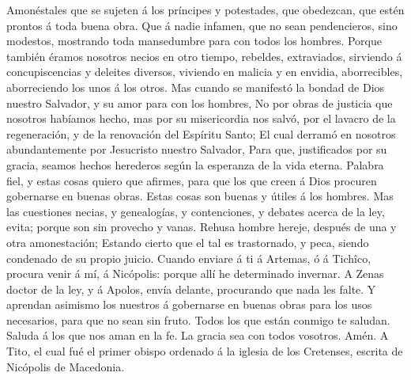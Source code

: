  Amonéstales que se sujeten á los príncipes y potestades,
que obedezcan, que estén prontos á toda buena obra.  Que á
nadie infamen, que no sean pendencieros, sino modestos, mostrando toda
mansedumbre para con todos los hombres.  Porque también
éramos nosotros necios en otro tiempo, rebeldes, extraviados, sirviendo
á concupiscencias y deleites diversos, viviendo en malicia y en envidia,
aborrecibles, aborreciendo los unos á los otros.  Mas cuando
se manifestó la bondad de Dios nuestro Salvador, y su amor para con los
hombres,  No por obras de justicia que nosotros habíamos
hecho, mas por su misericordia nos salvó, por el lavacro de la
regeneración, y de la renovación del Espíritu Santo;  El
cual derramó en nosotros abundantemente por Jesucristo nuestro Salvador,
 Para que, justificados por su gracia, seamos hechos
herederos según la esperanza de la vida eterna.  Palabra
fiel, y estas cosas quiero que afirmes, para que los que creen á Dios
procuren gobernarse en buenas obras. Estas cosas son buenas y útiles á
los hombres.  Mas las cuestiones necias, y genealogías, y
contenciones, y debates acerca de la ley, evita; porque son sin provecho
y vanas.  Rehusa hombre hereje, después de una y otra
amonestación;  Estando cierto que el tal es trastornado, y
peca, siendo condenado de su propio juicio.  Cuando enviare
á ti á Artemas, ó á Tichîco, procura venir á mí, á Nicópolis: porque
allí he determinado invernar.  A Zenas doctor de la ley, y
á Apolos, envía delante, procurando que nada les falte.  Y
aprendan asimismo los nuestros á gobernarse en buenas obras para los
usos necesarios, para que no sean sin fruto.  Todos los que
están conmigo te saludan. Saluda á los que nos aman en la fe. La gracia
sea con todos vosotros. Amén. A Tito, el cual fué el primer obispo
ordenado á la iglesia de los Cretenses, escrita de Nicópolis de
Macedonia.
